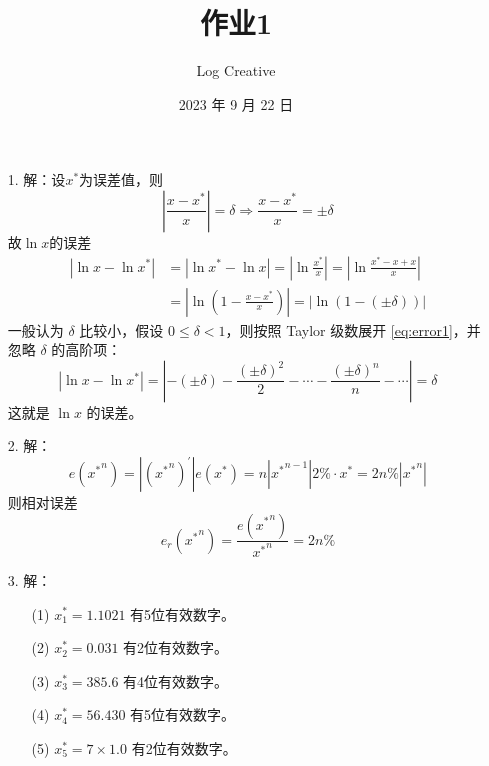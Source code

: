 \documentclass{sjtuarticle}
\title{作业1}
\author{Log Creative}
\date{2023 年 9 月 22 日}
\begin{document}
\maketitle
\begin{itemize}
    \item[1.] 解：设$x^*$为误差值，则
    \begin{equation*}
        \left\lvert\frac{x-x^*}{x}\right\rvert=\delta\Rightarrow \frac{x-x^*}{x}=\pm \delta
    \end{equation*}
    故$\ln x$的误差
    \begin{equation}\label{eq:error1}
        \begin{aligned}
            \left|\ln x-\ln x^*\right|&=\left|\ln x^*-\ln x\right|=\left\lvert\ln\frac{x^*}{x}\right\rvert=\left|\ln\frac{x^*-x+x}{x}\right|\\
            &=\left|\ln\left(1-\frac{x-x^*}{x}\right)\right|
            =\left|\ln(1-(\pm \delta))\right|
        \end{aligned}
    \end{equation}
    一般认为 $\delta$ 比较小，假设 $0\leq\delta<1$，则按照 Taylor 级数展开 \eqref{eq:error1}，并忽略 $\delta$ 的高阶项：
    \begin{equation*}
        |\ln x-\ln x^*|=\left|-(\pm \delta)-\frac{(\pm \delta)^2}{2}-\cdots-\frac{(\pm \delta)^n}{n}-\cdots\right|=\delta
    \end{equation*}
    这就是 $\ln x$ 的误差。
    \item[2.] 解：\begin{equation*}
        e({x^*}^n)=|({x^*}^n)^\prime|e(x^*)=n|{x^*}^{n-1}|2\%\cdot x^*=2n\%|{x^*}^n|
    \end{equation*}
    则相对误差
    \begin{equation*}
        e_r({x^*}^n)=\frac{e({x^*}^n)}{{x^*}^n}=2n\%
    \end{equation*}
    \item[3.] 解：
        \begin{itemize}
            \item[(1)] $x_1^*=1.1021$ 有5位有效数字。
            \item[(2)] $x_2^*=0.031$ 有2位有效数字。
            \item[(3)] $x_3^*=385.6$ 有4位有效数字。
            \item[(4)] $x_4^*=56.430$ 有5位有效数字。
            \item[(5)] $x_5^*=7\times 1.0$ 有2位有效数字。   
        \end{itemize}

\end{itemize}
\end{document}
